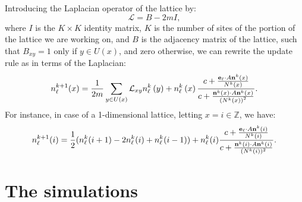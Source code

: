 Introducing the Laplacian operator of the lattice by: 
\[
\mathcal{L}=B-2mI,
\]
where $I$ is the $K\times K$ identity matrix, $K$ is the number
of sites of the portion of the lattice we are working on, and $B$
is the adjacency matrix of the lattice, such that $B_{xy}=1$ only
if $y\in U(x)$, and zero otherwise, we can rewrite the update rule
as in terms of the Laplacian: 
\begin{equation}
n_{\ell}^{k+1}(x)=\frac{1}{2m}\sum_{y\in U(x)}\mathcal{L}_{xy}n_{\ell}^{k}\left(y\right)+n_{\ell}^{k}\left(x\right)\frac{c+\frac{{\bf e}_{\ell}\cdot A{\bf n}^{k}\left(x\right)}{N^{k}\left(x\right)}}{c+\frac{{\bf n}^{k}\left(x\right)\cdot A{\bf n}^{k}\left(x\right)}{\left(N^{k}\left(x\right)\right)^{2}}}.\label{eq:discr}
\end{equation}
For instance, in case of a 1-dimensional lattice, letting $x=i\in\mathbb{Z}$,
we have:
\[
n_{\ell}^{k+1}(i)=\frac{1}{2}(n_{\ell}^{k}(i+1)-2n_{\ell}^{k}(i)+n_{\ell}^{k}(i-1))+n_{\ell}^{k}(i)\frac{c+\frac{{\bf e}_{\ell}\cdot A{\bf n}^{k}(i)}{N^{k}(i)}}{c+\frac{{\bf n}^{k}\left(i\right)\cdot A{\bf n}^{k}(i)}{(N^{k}(i))^{2}}}.
\]


\section{The simulations\label{sec:The-simulations-1}}

